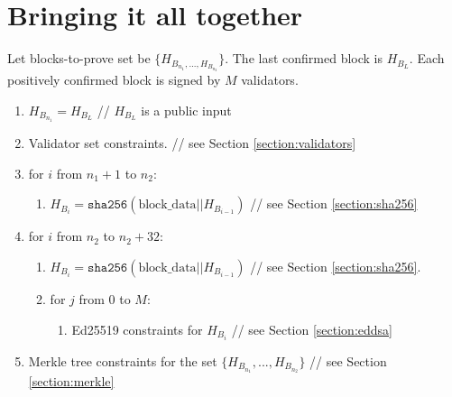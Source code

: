 \section{Bringing it all together}
\label{section:full}

Let blocks-to-prove set be $\{H_{B_{n_1}, ..., H_{B_{n_2}}}\}$.
The last confirmed block is $H_{B_{L}}$.
Each positively confirmed block is signed by $M$ validators. 

\begin{enumerate}
	\item $H_{B_{n_1}} = H_{B_{L}}$ // $ H_{B_{L}}$ is a public input
	\item Validator set constraints. // see Section \ref{section:validators}
	\item for $i$ from $n_1 + 1$ to $n_2$:
	\begin{enumerate}
		\item $H_{B_i} = \texttt{sha256}(\text{block\_data} || H_{B_{i - 1}})$ // see Section \ref{section:sha256}
	\end{enumerate}
	\item for $i$ from $n_2$ to $n_2 + 32$:
	\begin{enumerate}
		\item $H_{B_i} = \texttt{sha256}(\text{block\_data} || H_{B_{i - 1}})$ // see Section \ref{section:sha256}. 
		\item for $j$ from $0$ to $M$:
		\begin{enumerate}
			\item Ed25519 constraints for $H_{B_i}$ // see Section \ref{section:eddsa}
		\end{enumerate}
	\end{enumerate}
	\item Merkle tree constraints for the set $\{H_{B_{n_1}}, ..., H_{B_{n_2}}\}$ // see Section \ref{section:merkle}
\end{enumerate}
